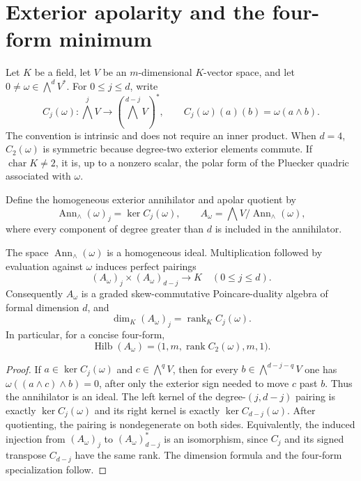 \section{Exterior apolarity and the four-form minimum}
\label{sec:four-form-problem}

Let $K$ be a field, let $V$ be an $m$-dimensional $K$-vector space, and
let $0\ne\omega\in\bigwedge^d V^*$.  For $0\leq j\leq d$, write
\[
  C_j(\omega):\bigwedge^jV\longrightarrow
  \left(\bigwedge^{d-j}V\right)^*,
  \qquad
  C_j(\omega)(a)(b)=\omega(a\wedge b).
\]
The convention is intrinsic and does not require an inner product.  When
$d=4$, $C_2(\omega)$ is symmetric because degree-two exterior elements
commute.  If $\operatorname{char}K\ne2$, it is, up to a nonzero scalar,
the polar form of the Pluecker quadric associated with $\omega$.

Define the homogeneous exterior annihilator and apolar quotient by
\[
  \operatorname{Ann}_\wedge(\omega)_j
  =\ker C_j(\omega),
  \qquad
  A_\omega=\bigwedge V/\operatorname{Ann}_\wedge(\omega),
\]
where every component of degree greater than $d$ is included in the
annihilator.

\begin{proposition}
\label{prop:exterior-apolar-duality}
The space $\operatorname{Ann}_\wedge(\omega)$ is a homogeneous ideal.
Multiplication followed by evaluation against $\omega$ induces perfect
pairings
\[
  (A_\omega)_j\times(A_\omega)_{d-j}\longrightarrow K
  \quad(0\leq j\leq d).
\]
Consequently $A_\omega$ is a graded skew-commutative Poincare-duality
algebra of formal dimension $d$, and
\[
  \dim_K(A_\omega)_j=\operatorname{rank}_K C_j(\omega).
\]
In particular, for a concise four-form,
\[
  \operatorname{Hilb}(A_\omega)
  =\bigl(1,m,\operatorname{rank}C_2(\omega),m,1\bigr).
\]
\end{proposition}

\begin{proof}
If $a\in\ker C_j(\omega)$ and $c\in\bigwedge^qV$, then for every
$b\in\bigwedge^{d-j-q}V$ one has
$\omega((a\wedge c)\wedge b)=0$, after only the exterior sign needed to
move $c$ past $b$.  Thus the annihilator is an ideal.  The left kernel of
the degree-$(j,d-j)$ pairing is exactly $\ker C_j(\omega)$ and its right
kernel is exactly $\ker C_{d-j}(\omega)$.  After quotienting, the pairing
is nondegenerate on both sides.  Equivalently, the induced injection from
$(A_\omega)_j$ to $(A_\omega)_{d-j}^*$ is an isomorphism, since $C_j$ and
its signed transpose $C_{d-j}$ have the same rank.  The dimension formula
and the four-form specialization follow.
\end{proof}

